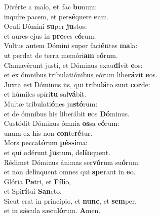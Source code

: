 \evenverse Divérte a malo, \textbf{et} fac \textbf{bo}num:~\*\\
\evenverse inquíre pacem, et per\textbf{sé}quere \textbf{e}am.\\
\oddverse Oculi Dómini \textbf{su}per \textbf{ju}stos:~\*\\
\oddverse et aures ejus in \textbf{pre}ces e\textbf{ó}rum.\\
\evenverse Vultus autem Dómini super faci\textbf{én}tes \textbf{ma}la:~\*\\
\evenverse ut perdat de terra memóri\textbf{am} e\textbf{ó}rum.\\
\oddverse Clamavérunt justi, et Dóminus exau\textbf{dí}vit \textbf{e}os:~\*\\
\oddverse et ex ómnibus tribulatiónibus eórum libe\textbf{rá}vit \textbf{e}os.\\
\evenverse Juxta est Dóminus iis, qui tribu\textbf{lá}to sunt \textbf{cor}de:~\*\\
\evenverse et húmiles spíri\textbf{tu} sal\textbf{vá}bit.\\
\oddverse Multæ tribulati\textbf{ó}nes ju\textbf{stó}rum:~\*\\
\oddverse et de ómnibus his liberábit \textbf{e}os \textbf{Dó}minus.\\
\evenverse Custódit Dóminus ómnia \textbf{os}sa e\textbf{ó}rum:~\*\\
\evenverse unum ex his non \textbf{con}te\textbf{ré}tur.\\
\oddverse Mors pecca\textbf{tó}rum \textbf{pés}\textbf{si}ma:~\*\\
\oddverse et qui odérunt \textbf{ju}stum, de\textbf{lín}quent.\\
\evenverse Rédimet Dóminus ánimas ser\textbf{vó}rum su\textbf{ó}rum:~\*\\
\evenverse et non delínquent omnes qui \textbf{spe}rant in \textbf{e}o.\\
\oddverse Glória \textbf{Pa}tri, et \textbf{Fí}\textbf{li}o,~\*\\
\oddverse et Spi\textbf{rí}tui \textbf{San}cto.\\
\evenverse Sicut erat in princípio, et \textbf{nunc}, et \textbf{sem}per,~\*\\
\evenverse et in sǽcula sæcu\textbf{ló}rum. \textbf{A}men.\\
